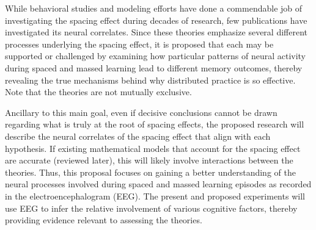 
While behavioral studies and modeling efforts have done a commendable job of investigating the spacing effect during decades of research, few publications have investigated its neural correlates.  Since these theories emphasize several different processes underlying the spacing effect, it is proposed that each may be supported or challenged by examining how particular patterns of neural activity during spaced and massed learning lead to different memory outcomes, thereby revealing the true mechanisms behind why distributed practice is so effective.  Note that the theories are not mutually exclusive.

Ancillary to this main goal, even if decisive conclusions cannot be drawn regarding what is truly at the root of spacing effects, the proposed research will describe the neural correlates of the spacing effect that align with each hypothesis.  If existing mathematical models that account for the spacing effect are accurate (reviewed later), this will likely involve interactions between the theories.  Thus, this proposal focuses on gaining a better understanding of the neural processes involved during spaced and massed learning episodes as recorded in the electroencephalogram (EEG).  The present and proposed experiments will use EEG to infer the relative involvement of various cognitive factors, thereby providing evidence relevant to assessing the theories.






